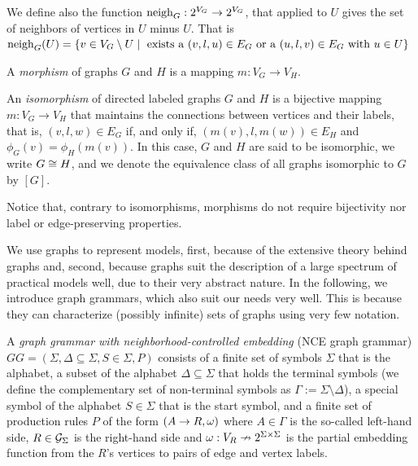 We define also the function $\operatorname{neigh}_{G}: 2^{V_G} \to 2^{V_G}$, that applied to $U$ gives the set of neighbors of vertices in $U$ minus $U$. That is $\operatorname{neigh}_{G}(U) = \{ v \in V_G \setminus U \; | \; \text{ exists a } (v,l,u) \in E_G \text{ or a } (u,l,v) \in E_G \text{ with } u \in U \}$

\begin{definition}
	\label{def:morphism}
	A \emph{morphism} of graphs $G$ and $H$ is a mapping $m: V_G \to V_H$.
\end{definition}

\begin{definition}
	An \emph{isomorphism} of directed labeled graphs $G$ and $H$ is a bijective mapping $m: V_G \to V_H$ that maintains the connections between vertices and their labels, that is, $(v,l,w) \in E_G$ if, and only if, $(m(v),l,m(w)) \in E_H$ and $\phi_G(v) = \phi_H(m(v))$. In this case, $G$ and $H$ are said to be isomorphic, we write $G \cong H$, and we denote the equivalence class of all graphs isomorphic to $G$ by $[G]$.
\end{definition}

Notice that, contrary to isomorphisms, morphisms do not require bijectivity nor label or edge-preserving properties.

We use graphs to represent models, first, because of the extensive theory behind graphs and, second, because graphs suit the description of a large spectrum of practical models well, due to their very abstract nature. In the following, we introduce graph grammars, which also suit our needs very well. This is because they can characterize (possibly infinite) sets of graphs using very few notation.

\begin{definition}
	\label{def:gg}
	A \emph{graph grammar with neighborhood-controlled embedding} (NCE graph grammar) $GG = (\Sigma, \Delta \subseteq \Sigma, S \in \Sigma, P)$ consists of a finite set of symbols $\Sigma$ that is the alphabet, a subset of the alphabet $\Delta \subseteq \Sigma$ that holds the terminal symbols (we define the complementary set of non-terminal symbols as $\Gamma := \Sigma \setminus \Delta$), a special symbol of the alphabet $S \in \Sigma$ that is the start symbol, and a finite set of production rules $P$ of the form $(A \to R, \omega)$ where $A \in \Gamma$ is the so-called left-hand side, $R \in \mathcal{G}_{\Sigma}$ is the right-hand side and $\omega : V_R \nrightarrow 2^{\Sigma \times \Sigma}$ is the partial embedding function from the $R$'s vertices to pairs of edge and vertex labels.
\end{definition}

